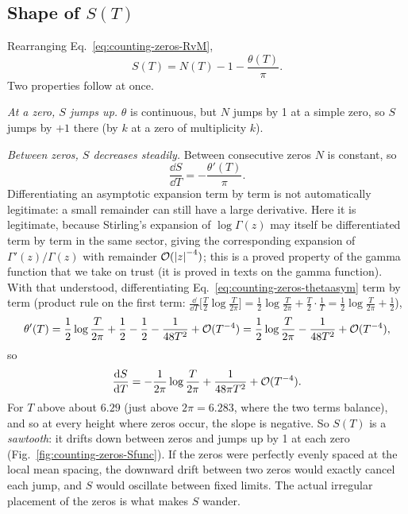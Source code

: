 \subsection{Shape of $S(T)$}

Rearranging Eq.~\eqref{eq:counting-zeros-RvM},
\begin{equation}
S(T)=N(T)-1-\frac{\theta(T)}{\pi}.
\label{eq:counting-zeros-Sfromcount}
\end{equation}
Two properties follow at once.

\emph{At a zero, $S$ jumps up.} $\theta$ is continuous, but $N$ jumps by 1 at a simple zero, so $S$ jumps by $+1$ there (by $k$ at a zero of multiplicity $k$).

\emph{Between zeros, $S$ decreases steadily.} Between consecutive zeros $N$ is constant, so
\begin{equation}
\frac{\dd S}{\dd T}=-\frac{\theta'(T)}{\pi}.
\end{equation}
Differentiating an asymptotic expansion term by term is not automatically legitimate: a small remainder can still have a large derivative. Here it is legitimate, because Stirling's expansion of $\log\Gamma(z)$ may itself be differentiated term by term in the same sector, giving the corresponding expansion of $\Gamma'(z)/\Gamma(z)$ with remainder $\mathcal{O}(\left\lvert z\right\rvert^{-4})$; this is a proved property of the gamma function that we take on trust (it is proved in texts on the gamma function). With that understood, differentiating Eq.~\eqref{eq:counting-zeros-thetaasym} term by term (product rule on the first term: $\frac{\dd}{\dd T}\bigl[\frac T2\log\frac T{2\pi}\bigr]=\frac12\log\frac T{2\pi}+\frac T2\cdot\frac1T=\frac12\log\frac{T}{2\pi}+\frac12$),
\begin{equation}
\theta'(T)=\frac12\log\frac{T}{2\pi}+\frac12-\frac12-\frac{1}{48T^2}+\mathcal{O}(T^{-4})=\frac12\log\frac{T}{2\pi}-\frac{1}{48T^2}+\mathcal{O}(T^{-4}),
\end{equation}
so
\begin{equation}
\frac{\mathrm{d} S}{\mathrm{d} T}=-\frac{1}{2\pi}\log\frac{T}{2\pi}+\frac{1}{48\pi T^2}+\mathcal{O}(T^{-4}).
\label{eq:counting-zeros-Sslope}
\end{equation}
For $T$ above about $6.29$ (just above $2\pi=6.283$, where the two terms balance), and so at every height where zeros occur, the slope is negative. So $S(T)$ is a \emph{sawtooth}: it drifts down between zeros and jumps up by 1 at each zero (Fig.~\ref{fig:counting-zeros-Sfunc}). If the zeros were perfectly evenly spaced at the local mean spacing, the downward drift between two zeros would exactly cancel each jump, and $S$ would oscillate between fixed limits. The actual irregular placement of the zeros is what makes $S$ wander.

